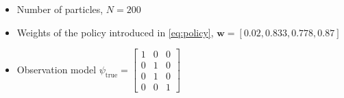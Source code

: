 \begin{itemize}
	\item Number of particles, $ N = 200 $
	\item Weights of the policy introduced in \autoref{eq:policy}, $ \textbf{w} = [0.02, 0.833, 0.778, 0.87] $
	\item Observation model
	$\psi_{\text{true}} =
	\begin{bmatrix}
		1 & 0 & 0 \\
		0 & 1 & 0 \\
		0 & 1 & 0 \\
		0 & 0 & 1
	\end{bmatrix}$
\end{itemize}

